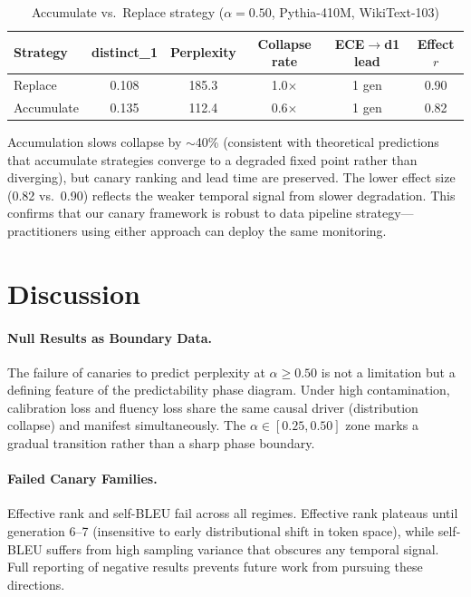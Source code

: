 \documentclass[letterpaper]{article}
\begin{document}
\begin{table}[h]
\centering
\caption{Accumulate vs.\ Replace strategy ($\alpha=0.50$, Pythia-410M, WikiText-103)}
\label{tab:strategy}
\begin{tabular}{lccccc}
\toprule
Strategy & distinct\_1 & Perplexity & Collapse rate & ECE$\to$d1 lead & Effect $r$ \\
\midrule
Replace & 0.108 & 185.3 & 1.0$\times$ & 1 gen & 0.90 \\
Accumulate & 0.135 & 112.4 & 0.6$\times$ & 1 gen & 0.82 \\
\bottomrule
\end{tabular}
\end{table}

Accumulation slows collapse by $\sim$40\% (consistent with theoretical predictions that accumulate strategies converge to a degraded fixed point rather than diverging), but canary ranking and lead time are preserved. The lower effect size (0.82 vs.\ 0.90) reflects the weaker temporal signal from slower degradation. This confirms that our canary framework is robust to data pipeline strategy---practitioners using either approach can deploy the same monitoring.

\section{Discussion}

\paragraph{Null Results as Boundary Data.} The failure of canaries to predict perplexity at $\alpha \geq 0.50$ is not a limitation but a defining feature of the predictability phase diagram. Under high contamination, calibration loss and fluency loss share the same causal driver (distribution collapse) and manifest simultaneously. The $\alpha \in [0.25, 0.50]$ zone marks a gradual transition rather than a sharp phase boundary.

\paragraph{Failed Canary Families.} Effective rank and self-BLEU fail across all regimes. Effective rank plateaus until generation 6--7 (insensitive to early distributional shift in token space), while self-BLEU suffers from high sampling variance that obscures any temporal signal. Full reporting of negative results prevents future work from pursuing these directions.
\end{document}
